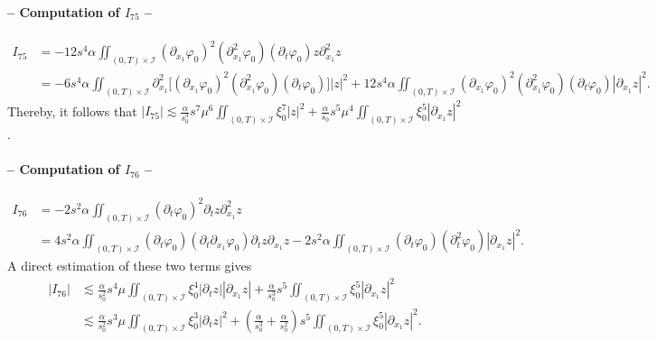 \documentclass[a4paper, 12pt]{article}
\theoremstyle{plain}
\theoremstyle{definition}
\numberwithin{theorem}{section}
\numberwithin{equation}{section}
\begin{document}
{\paragraph{-- Computation of $I_{75}$ --}
\begin{align*}
I_{75}&=-12s^4\alpha\iint_{(0,T)\times\mathcal{I}}(\partial_{x_1}\varphi_0)^2(\partial^2_{x_1}\varphi_0)(\partial_t\varphi_0)z\partial^2_{x_1}z\\
&=-6s^4\alpha\iint_{(0,T)\times\mathcal{I}}\partial^2_{x_1}\big[(\partial_{x_1}\varphi_0)^2(\partial^2_{x_1}\varphi_0)(\partial_t\varphi_0)\big]|z|^2+12s^4\alpha\iint_{(0,T)\times\mathcal{I}}(\partial_{x_1}\varphi_0)^2(\partial^2_{x_1}\varphi_0)(\partial_t\varphi_0)|\partial_{x_1}z|^2.\end{align*}
Thereby, it follows that
$\displaystyle |I_{75}|\lesssim \frac{\alpha}{s_0^3} s^7\mu^6\iint_{(0,T)\times\mathcal{I}}\xi_0^7|z|^2+\frac{\alpha}{s_0}s^5\mu^4\iint_{(0,T)\times\mathcal{I}}\xi_0^5|\partial_{x_1}z|^2$.

\paragraph{-- Computation of $I_{76}$ --}
\begin{align*}
I_{76}&=-2s^2\alpha\iint_{(0,T)\times\mathcal{I}}(\partial_t\varphi_0)^2\partial_tz\partial^2_{x_1}z\\
&=4s^2\alpha\iint_{(0,T)\times\mathcal{I}}(\partial_t\varphi_0)(\partial_t\partial_{x_1}\varphi_0)\partial_tz\partial_{x_1}z-2s^2\alpha\iint_{(0,T)\times\mathcal{I}}(\partial_t\varphi_0)(\partial_t^2\varphi_0)|\partial_{x_1}z|^2.\end{align*}
A direct estimation of these two terms gives
\begin{align*}
|I_{76}| &\lesssim \frac{\alpha}{s_0^2} s^4\mu \iint_{(0,T)\times\mathcal{I}}\xi_0^4|\partial_tz||\partial_{x_1}z|+\frac{\alpha}{s_0^3} s^5\iint_{(0,T)\times\mathcal{I}}\xi_0^5|\partial_{x_1}z|^2\\
&\lesssim \frac{\alpha}{s_0^2} s^3\mu \iint_{(0,T)\times\mathcal{I}}\xi_0^3|\partial_tz|^2+\left(\frac{\alpha}{s_0^3}+\frac{\alpha}{s_0^2}\right) s^5\iint_{(0,T)\times\mathcal{I}}\xi_0^5|\partial_{x_1}z|^2.
\end{align*}
}
\end{document}
